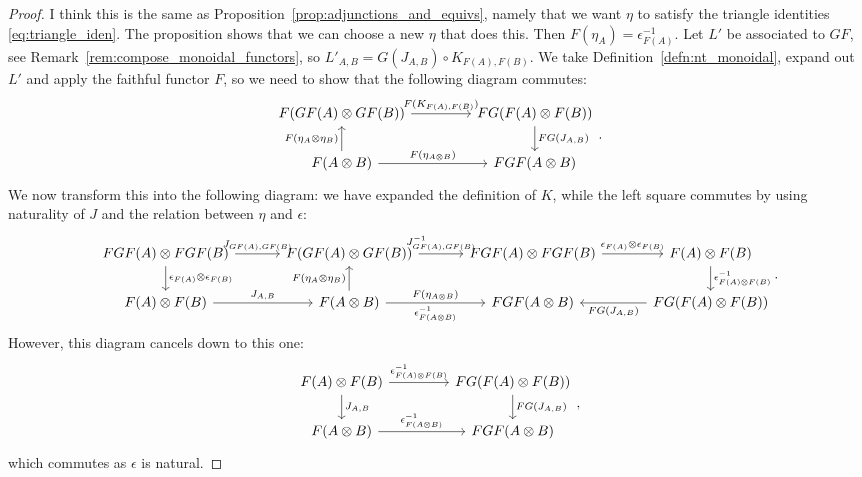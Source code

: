 \documentclass[a4paper,11pt]{article}
\theoremstyle{plain}
\theoremstyle{remark}
\begin{document}
\begin{proof}
I think this is the same as Proposition~\ref{prop:adjunctions_and_equivs}, namely that we want $\eta$ to satisfy the triangle identities \eqref{eq:triangle_iden}.  The proposition shows that we can choose a new $\eta$ that does this.  Then $F(\eta_A) = \epsilon^{-1}_{F(A)}$.  Let $L'$ be associated to $GF$, see Remark~\ref{rem:compose_monoidal_functors}, so $L'_{A,B} = G(J_{A,B}) \circ K_{F(A), F(B)}$.  We take Definition~\ref{defn:nt_monoidal}, expand out $L'$ and apply the faithful functor $F$, so we need to show that the following diagram commutes:
\[\begin{tikzcd}[column sep=10ex]
F(GF(A)\otimes GF(B))  \ar[r, "F(K_{F(A), F(B)})"]  &  FG(F(A)\otimes F(B)) \ar[d, "FG(J_{A,B})"]  \\
F(A\otimes B) \ar[u, "F(\eta_A\otimes\eta_B)"] \ar[r, "F(\eta_{A\otimes B})"]  &  FGF(A\otimes B)
\end{tikzcd}.\]
We now transform this into the following diagram: we have expanded the definition of $K$, while the left square commutes by using naturality of $J$ and the relation between $\eta$ and $\epsilon$:
\[\begin{tikzcd}[column sep=7.5ex]
FGF(A) \otimes FGF(B) \ar[r, "J_{GF(A),GF(B)}"] \ar[d, "\epsilon_{F(A)}\otimes\epsilon_{F(B)}"]
  &  F(GF(A)\otimes GF(B)) \ar[r, "J^{-1}_{GF(A),GF(B)}"]
  &  FGF(A) \otimes FGF(B) \ar[r, "\epsilon_{F(A)}\otimes\epsilon_{F(B)}"]
  &  F(A)\otimes F(B) \ar[d, "\epsilon_{F(A)\otimes F(B)}^{-1}"]  \\
F(A)\otimes F(B) \ar[r, "J_{A,B}"]
  &  F(A\otimes B) \ar[u, "F(\eta_A\otimes\eta_B)"] \ar[r, "F(\eta_{A\otimes B})", "\epsilon^{-1}_{F(A\otimes B)}"' ]
  &  FGF(A\otimes B)
  &  FG(F(A)\otimes F(B)) \ar[l, "FG(J_{A,B})"]
\end{tikzcd}. \]
However, this diagram cancels down to this one:
\[\begin{tikzcd}[column sep=10ex]
F(A)\otimes F(B) \ar[r, "\epsilon_{F(A)\otimes F(B)}^{-1}"] \ar[d, "J_{A,B}"]
  &  FG(F(A)\otimes F(B)) \ar[d, "FG(J_{A,B})"]  \\
F(A\otimes B)  \ar[r, "\epsilon^{-1}_{F(A\otimes B)}" ]
  & FGF(A\otimes B)
\end{tikzcd}, \]
which commutes as $\epsilon$ is natural.
\end{proof}
\end{document}
